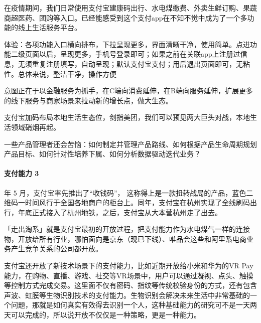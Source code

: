 \documentclass[letterpaper,11pt,english]{sphinxmanual}
\begin{document}
在疫情期间，我们日常使用支付宝建康码出行、水电煤缴费、外卖生鲜订购、果蔬商超医药、团购等入口。已经能感受到这个支付app在不知不觉中成为了一个多功能的线上生活服务平台。

体验：各项功能入口横向排布，下拉呈现更多，界面清晰干净，使用简单。点进功能二级页面以后，呈现更多，手机号登录即可；如果之前在关联app上注册过信息，无须重复注册填写，自动呈现；默认支付宝支付；用后退出页面即可，无粘性。总体来说，整洁干净，操作方便
%
\begin{footnote}[310]\sphinxAtStartFootnote
{}
%
\end{footnote}

意图正在于以金融服务为抓手，在C端向消费延伸，在B端向服务延伸，扩展更多的线下服务与商家场景来拉动新的增长点，做大生态。

支付宝加码布局本地生活生态位，剑指美团，我们可以预见两大巨头对战，本地生活领域硝烟再起。

一些产品管理者还会苦恼：如何制定并管理产品路线、如何根据产品生命周期规划产品目标、如何针对性培养下属、如何分析数据驱动迭代业务？


\paragraph{支付能力 3\sphinxfootnotemark[311]}
\label{\detokenize{chapter_dive/alipay:id7}}%
\begin{footnotetext}[311]\sphinxAtStartFootnote
{}
%
\end{footnotetext} 年 5 月，支付宝率先推出了“收钱码”，
这称得上是一款扭转战局的产品，蓝色二维码一时间风行于全国各地商户的柜台上。同年，支付宝在杭州实现了全线刷码出行，年底正式接入了杭州地铁，之后，支付宝从大本营杭州走了出去。%
\begin{footnote}[312]\sphinxAtStartFootnote
{}
%
\end{footnote}

「走出淘系」就是支付宝最初的开放过程，把支付能力作为水电煤气一样的连接物，开放给所有行业，哪怕面向是京东（现已下线）、唯品会这些和阿里系电商业务产生竞争关系的公司都开放。

支付宝还开放了新技术场景下的支付能力，比如近期开放给小米和华为的VR
Pay能力，在购物、直播、游戏、社交等VR场景中，用户可以通过凝视、点头、触摸等控制方式完成交易。这里面不仅有密码、指纹等传统校验身份的方式，还有包含声波、虹膜等生物识别技术的支付能力。生物识别会解决未来生活中非常基础的一个问题，那就是如何真实有效得去识别一个人，这种基础能力的研究可不是一天两天可以完成的，所以说开放不仅仅是一种策略，更是一种能力。
\end{document}
